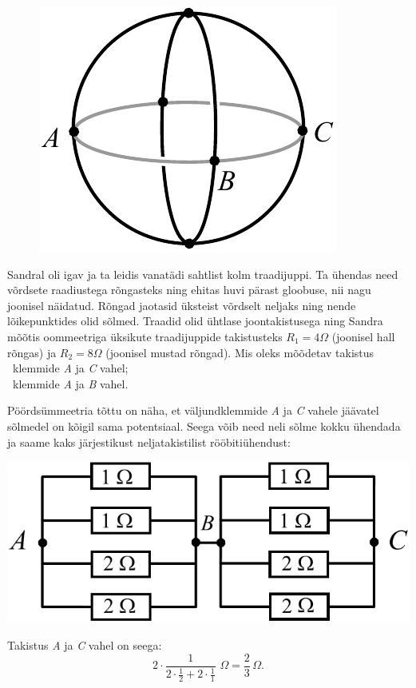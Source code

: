 \setAuthor{}

\begin{figure}
  \vspace{-25pt}
  \begin{center}
  \includegraphics[scale=0.7]{2020-v3g-05-yl.pdf}
  \end{center}
  \vspace{-25pt}
\end{figure}
Sandral oli igav ja ta leidis vanatädi sahtlist kolm traadijuppi.
Ta ühendas need võrdsete raadiustega rõngasteks ning ehitas  huvi pärast gloobuse,
nii nagu joonisel näidatud. Rõngad jaotasid üksteist võrdselt neljaks ning nende
lõikepunktides olid sõlmed. Traadid olid ühtlase joontakistusega ning Sandra mõõtis
oommeetriga üksikute traadijuppide takistusteks $R_1=\SI{4}\Omega$ (joonisel hall
rõngas) ja $R_2=\SI{8}\Omega$ (joonisel mustad rõngad). Mis oleks mõõdetav takistus \\
\osa~klemmide \emph{A} ja \emph{C} vahel;\\
\osa~klemmide \emph{A} ja \emph{B} vahel.\\


\hint

\solu
\osa Pöördsümmeetria tõttu on näha, et väljundklemmide \emph{A} ja \emph{C} vahele jäävatel sõlmedel on kõigil sama potentsiaal. Seega võib need neli sõlme kokku ühendada ja saame kaks järjestikust neljatakistilist rööbitiühendust:\\
\begin{center}
\includegraphics[scale=0.8]{2020-v3g-05-yl1.pdf}\\
\end{center}
Takistus \emph{A} ja \emph{C} vahel on seega: $$2 \cdot \frac{1}{\displaystyle{2 \cdot \frac{1}{2} + 2 \cdot \frac{1}{1}}} \,\, \SI{}\Omega=\frac{2}{3} \, \SI{}\Omega.$$


